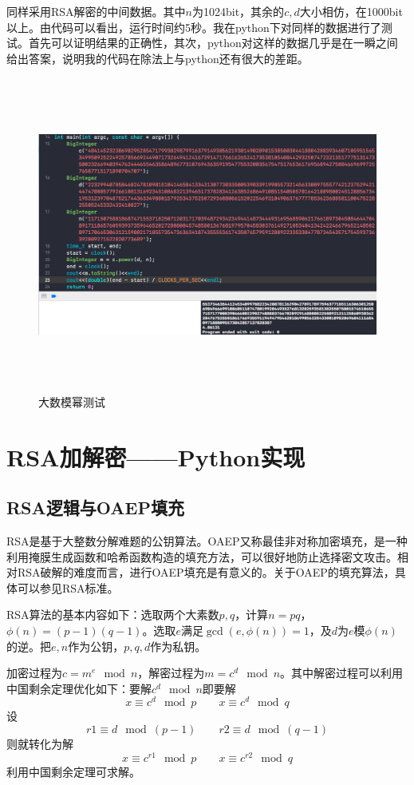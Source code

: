 \documentclass[11pt]{ctexart}
\begin{document}
\begin{enumerate}
    同样采用RSA解密的中间数据。其中$n$为1024bit，其余的$c,d$大小相仿，在1000bit以上。由代码可以看出，运行时间约5秒。我在python下对同样的数据进行了测试。首先可以证明结果的正确性，其次，python对这样的数据几乎是在一瞬之间给出答案，说明我的代码在除法上与python还有很大的差距。
    \begin{figure}[htbp]
    \centering
    \includegraphics[height=10.37cm,width=17.54cm]{test_power.png}
    \caption{大数模幂测试}
    \label{test_power}
    \end{figure}

\end{enumerate}

\section{RSA加解密——Python实现} %
\subsection{RSA逻辑与OAEP填充} %
RSA是基于大整数分解难题的公钥算法。OAEP又称最佳非对称加密填充，是一种利用掩膜生成函数和哈希函数构造的填充方法，可以很好地防止选择密文攻击。相对RSA破解的难度而言，进行OAEP填充是有意义的。关于OAEP的填充算法，具体可以参见RSA标准。

RSA算法的基本内容如下：选取两个大素数$p, q$，计算$n = pq$，$\phi(n) = (p-1)(q-1)$。选取$e$满足$\gcd(e, \phi(n)) = 1$，及$d$为$e$模$\phi(n)$的逆。把$e, n$作为公钥，$p, q, d$作为私钥。

加密过程为$c = m^e \mod n$，解密过程为$m = c^d \mod n$。其中解密过程可以利用中国剩余定理优化如下：要解$c^d \mod n$即要解
$$x \equiv c^d \mod p \quad \quad x \equiv c^d \mod q$$
设
$$r1 \equiv d \mod (p-1) \quad \quad r2 \equiv d \mod (q-1)$$
则就转化为解
$$x \equiv c^{r1} \mod p \quad \quad x \equiv c^{r2} \mod q$$
利用中国剩余定理可求解。
\end{document}
